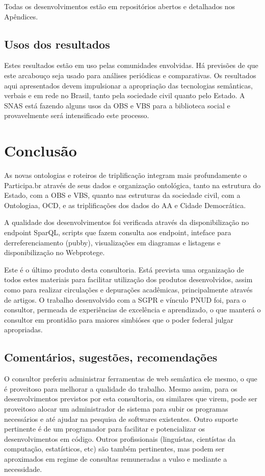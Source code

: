 \documentclass[12pt]{article}
\begin{document}
Todas os desenvolvimentos estão em repositórios abertos e detalhados nos Apêndices.
\subsection{Usos dos resultados}\label{sec:uso}
Estes resultados estão em uso pelas comunidades envolvidas. Há previsões de que este arcabouço seja usado para análises periódicas e comparativas. Os resultados aqui apresentados devem impulsionar a apropriação das tecnologias semânticas, verbais e em rede no Brasil, tanto pela sociedade civil quanto pelo Estado. A SNAS está fazendo alguns usos da OBS e VBS para a biblioteca social e provavelmente será intensificado este processo.

\section{Conclusão}
As novas ontologias e roteiros de triplificação integram mais profundamente o Participa.br através de seus dados e organização ontológica, 
tanto na estrutura do Estado, com a OBS e VBS, quanto nas estruturas da sociedade civil, com a Ontologiaa, OCD, e as triplificações dos dados do AA e Cidade Democrática.

A qualidade dos desenvolvimentos foi verificada através da disponibilização no endpoint SparQL, scripts que fazem consulta aos endpoint, inteface para derreferenciamento (pubby), visualizações em diagramas e listagens e disponibilização no Webprotege.

Este é o último produto desta consultoria. Está prevista uma organização de todos estes materiais para facilitar utilização dos produtos desenvolvidos, assim como para realizar circulações e depurações acadêmicas, principalmente através de artigos. O trabalho desenvolvido com a SGPR e vínculo PNUD foi, para o consultor, permeada de experiências de excelência e aprendizado, o que manterá o consultor em prontidão para maiores simbióses que o poder federal julgar apropriadas.

\subsection{Comentários, sugestões, recomendações}
O consultor preferiu administrar ferramentas de web semântica ele mesmo, o que é proveitoso para melhorar a qualidade do trabalho. Mesmo assim, para os desenvolvimentos previstos por esta consultoria, ou similares que virem, pode ser proveitoso alocar um administrador de sistema para subir os programas necessários e até ajudar na pesquisa de softwares existentes. Outro suporte pertinente é de um programador para facilitar e potencializar os desenvolvimentos em código. Outros profissionais (linguístas, cientístas da computação, estatísticos, etc) são também pertinentes, mas podem ser aproximados em regime de consultas remuneradas a vulso e mediante a necessidade.
\end{document}
